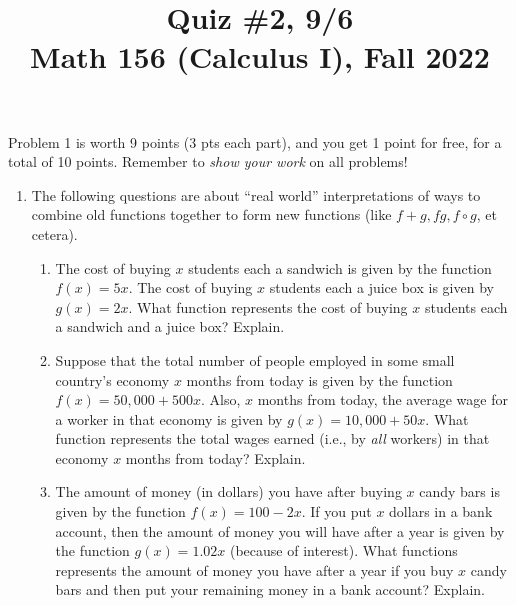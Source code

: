 \documentclass[11pt]{article}
\title{Quiz \#2, 9/6 \\ Math 156 (Calculus I), Fall 2022}
\date{}
\begin{document}
\maketitle

\thispagestyle{empty}

\vspace{-1cm}

Problem 1 is worth 9 points (3 pts each part), and you get 1 point for free, for a total of 10 points. Remember to \emph{show your work} on all problems!

\begin{enumerate}
\item The following questions are about ``real world'' interpretations of ways to combine old functions together to form new functions (like $f+g, fg, f \circ g$, et cetera).
\begin{enumerate}
\item The cost of buying $x$ students each a sandwich is given by the function $f(x) = 5x$. The cost of buying $x$ students each a juice box is given by $g(x)= 2x$. What function represents the cost of buying $x$ students each a sandwich and a juice box? Explain.
\item Suppose that the total number of people employed in some small country's economy $x$ months from today is given by the function $f(x) = 50,000 + 500x$. Also, $x$ months from today, the average wage for a worker in that economy is given by $g(x) = 10,000 + 50x$. What function represents the total wages earned (i.e., by \emph{all} workers) in that economy $x$ months from today? Explain.
\item The amount of money (in dollars) you have after buying $x$ candy bars is given by the function $f(x) = 100 - 2x$. If you put $x$ dollars in a bank account, then the amount of money you will have after a year is given by the function $g(x) = 1.02x$ (because of interest). What functions represents the amount of money you have after a year if you buy $x$ candy bars and then put your remaining money in a bank account? Explain.
\end{enumerate}

\end{enumerate}
\end{document}
